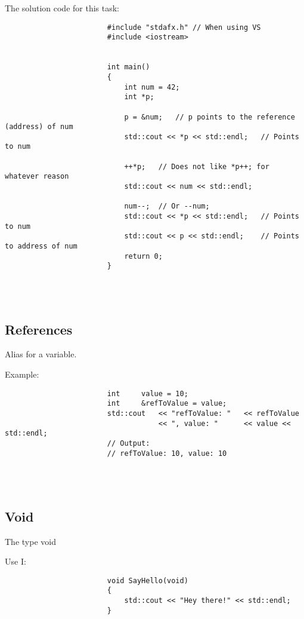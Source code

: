 \documentclass{report}
\begin{document}
				
				\begin{minipage}{\linewidth}
					The solution code for this task:
					\begin{lstlisting}
						#include "stdafx.h"	// When using VS
						#include <iostream>
						
						
						int main()
						{
							int num = 42;
							int *p;
							
							p = &num;	// p points to the reference (address) of num
							std::cout << *p << std::endl;	// Points to num
							
							++*p;	// Does not like *p++; for whatever reason
							std::cout << num << std::endl;
							
							num--;	// Or --num;
							std::cout << *p << std::endl;	// Points to num
							std::cout << p << std::endl;	// Points to address of num
							return 0;
						}
					\end{lstlisting}
				\end{minipage}
				\\ \\
			
			
			\subsection{References}
				Alias for a variable. \\
				
				\begin{minipage}{\linewidth}
					Example:
					\begin{lstlisting}
						int		value = 10;
						int		&refToValue = value;
						std::cout 	<< "refToValue: " 	<< refToValue
									<< ", value: " 		<< value << std::endl;
						// Output:
						// refToValue: 10, value: 10
					\end{lstlisting}
				\end{minipage}
				\\ \\
			\subsection{Void}
				The type void \\
				
				\begin{minipage}{\linewidth}
					Use I:
					\begin{lstlisting}
						void SayHello(void)
						{
							std::cout << "Hey there!" << std::endl;
						}
					\end{lstlisting}
				\end{minipage}
				\\ \\
				
\end{document}
